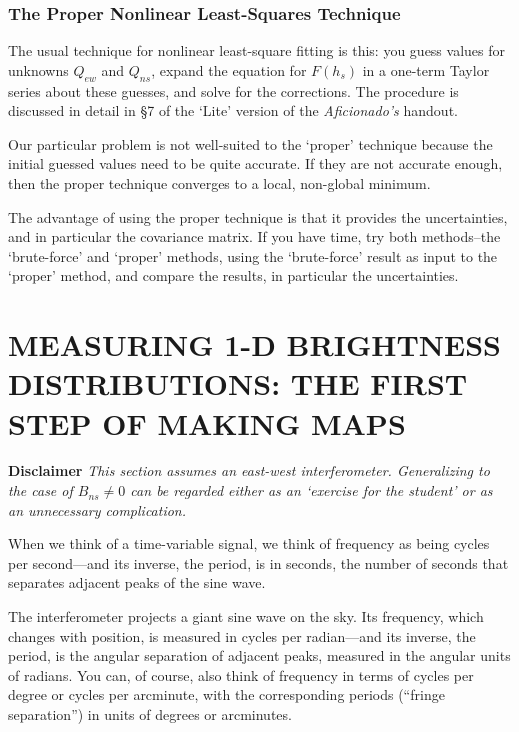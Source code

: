 \documentclass[11pt,preprint]{aastex}
\begin{document}
\subsubsection{The Proper Nonlinear Least-Squares Technique}

The usual technique for nonlinear least-square fitting is this: you
guess values for unknowns $Q_{ew}$ and $Q_{ns}$, expand the equation for
$F(h_s)$ in a one-term Taylor series about these guesses, and solve for
the corrections.  The procedure is discussed in detail in \S 7 of
the `Lite' version of the {\it Aficionado's} handout.

Our particular problem is not well-suited to the `proper' technique
because the initial guessed values need to be quite accurate. If they
are not accurate enough, then the proper technique converges to a local,
non-global minimum. 

The advantage of using the proper technique is that it provides the
uncertainties, and in particular the covariance matrix. If you have
time, try both methods--the `brute-force' and `proper' methods, using
the `brute-force' result as input to the `proper' method, and compare
the results, in particular the uncertainties. 

\section{MEASURING 1-D BRIGHTNESS DISTRIBUTIONS: THE FIRST STEP OF
MAKING MAPS} \label{mun}

{\bf Disclaimer} {\it This section assumes an east-west
interferometer. Generalizing to the case of $B_{ns} \ne 0$ can be
regarded either as an `exercise for the student' or as an unnecessary complication.}

	When we think of a time-variable signal, we think of frequency
as being cycles per second---and its inverse, the period, is in seconds,
the number of seconds that separates adjacent peaks of the sine wave. 

	The interferometer projects a giant sine wave on the sky. Its
frequency, which changes with position, is measured in cycles per
radian---and its inverse, the period, is the angular separation of
adjacent peaks, measured in the angular units of radians. You can, of
course, also think of frequency in terms of cycles per degree or cycles
per arcminute, with the corresponding periods (``fringe separation'') in
units of degrees or arcminutes. 
\end{document}
